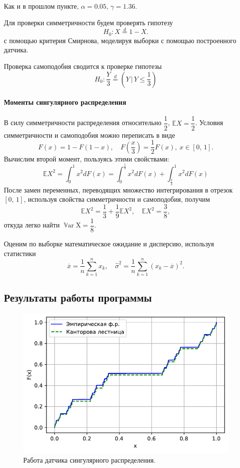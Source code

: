 \documentclass[16pt]{article}
\DeclareMathOperator*{\Var}{\mathbb{V}ar}
\begin{document}
Как и в прошлом пункте, $\alpha = 0.05,\, \gamma = 1.36$.

Для проверки симметричности будем проверять гипотезу
$$H_0\colon X \overset{d}{=} 1 - X.$$
с помощью критерия Смирнова, моделируя выборки с помощью построенного датчика.

Проверка самоподобия сводится к проверке гипотезы
$$H_0\colon \dfrac{Y}{3} \overset{d}{=} \left(Y \, \bigg| \, Y \leq \dfrac13\right)$$

\paragraph{Моменты сингулярного распределения}
В силу симметричности распределения относительно $\dfrac12$, $\mathbb{E}X = \dfrac12$.
Условия симметричности и самоподобия можно переписать в виде
$$F(x) = 1 - F(1 - x), \quad F\left(\frac{x}{3}\right) = \frac12 F(x), \ x \in [0, \, 1].$$
Вычислим второй момент, пользуясь этими свойствами:
$$\mathbb{E}X^2 = \int_0^1x^2dF(x) = \int_0^{\frac13}x^2dF(x)+\int_\frac23^1 x^2dF(x)$$
После замен переменных, переводящих множество интегрирования в отрезок $[0,\, 1]$, используя свойства симметричности и самоподобия, получим
$$\mathbb{E}X^2 = \frac13 + \frac19\mathbb{E}X^2, \quad \mathbb{E}X^2 = \frac38,$$
откуда легко найти $\Var \mathrm{X} = \dfrac18.$

Оценим по выборке математическое ожидание и дисперсию, используя статистики $$\overline{x} = \dfrac{1}{n}\sum\limits_{k=1}^{n}x_k, \quad {\hat \sigma}^2 = \dfrac{1}{n}\sum\limits_{k=1}^{n}(x_k - \overline{x})^2.$$
\subsection{Результаты работы программы}
\begin{figure}[h]
	\center
    \includegraphics[scale=0.7]{2_1.pdf}
    \caption{Работа датчика сингулярного распределения.}
\end{figure}
\end{document}
